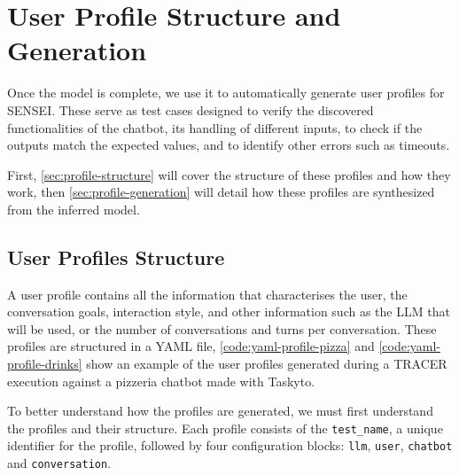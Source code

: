 
\chapter{User Profile Structure and Generation}\label{chapter:user-profiles}

Once the model is complete,
we use it to automatically generate user profiles for SENSEI.
These serve as test cases designed to verify
the discovered functionalities of the chatbot,
its handling of different inputs,
to check if the outputs match the expected values,
and to identify other errors such as timeouts.

First, \autoref{sec:profile-structure}
will cover the structure of these profiles and how they work,
then \autoref{sec:profile-generation}
will detail how these profiles are synthesized from the inferred model.


\section{User Profiles Structure}\label{sec:profile-structure}

A user profile contains all the information
that characterises the user,
the conversation goals,
interaction style,
and other information such as the \ac{LLM} that will be used,
or the number of conversations and turns per conversation.
These profiles are structured in a YAML file,
\autoref{code:yaml-profile-pizza} and \autoref{code:yaml-profile-drinks}
show an example of the user profiles generated during a \ac{TRACER} execution
against a pizzeria chatbot made with Taskyto.







To better understand how the profiles are generated,
we must first understand the profiles and their structure.
Each profile consists of the \texttt{test\_name},
a unique identifier for the profile,
followed by four configuration blocks:
\texttt{llm}, \texttt{user}, \texttt{chatbot} and \texttt{conversation}.

